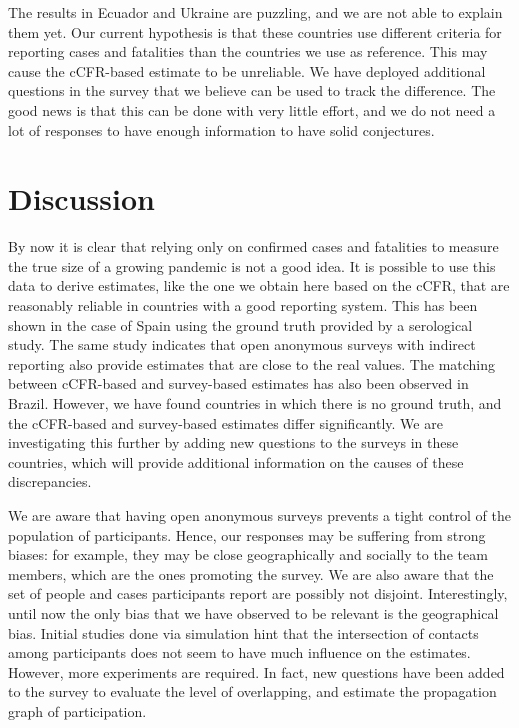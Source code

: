 \documentclass{article}
\newcommand{\af}[1]{{#1}}
\begin{document}
The results in Ecuador and Ukraine are puzzling, and we are not able to explain them yet. Our current hypothesis is that these countries use different criteria for reporting cases and fatalities than the countries we use as reference. This may cause the cCFR-based estimate to be unreliable. We have deployed additional questions in the survey that we believe can be used to track the difference. The good news is that this can be done with very little effort, and we do not need a lot of responses to have enough information to have solid conjectures.

\section{Discussion}

By now it is clear that relying only on confirmed cases and fatalities to measure the true size of a growing pandemic is not a good idea. It is possible to use this data to derive estimates, like the one we obtain here based on the cCFR, that are
reasonably reliable in countries with a good reporting system. This has been shown in the case of Spain using the ground
truth provided by a serological study. The same study indicates that open anonymous surveys with indirect reporting also provide estimates that are close to the real values. The matching between cCFR-based and survey-based estimates has also been observed in Brazil. However, we have found countries in which there is no ground truth, and the cCFR-based and survey-based estimates differ significantly. We are investigating this further by adding new questions to the surveys in these countries,
which will provide additional information on the causes of these discrepancies.

We are aware that having open anonymous surveys prevents a tight control of the population of participants. Hence, our responses may be suffering from strong biases: for example, they may be close geographically and socially to the team members, which are the ones promoting the survey. We are also aware that the set of people and cases participants report are possibly not disjoint. Interestingly, until now the only bias that we have observed to be relevant is the geographical bias. \af{Initial studies done via simulation hint that the} intersection of contacts among participants does not seem to have much influence on the estimates. \af{However, more experiments are required. In fact, new questions have been added to the survey to evaluate the level of overlapping, and estimate the propagation graph of participation.}
\end{document}
